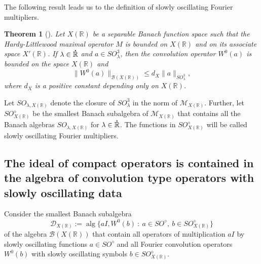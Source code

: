 \documentclass[reqno]{amsproc}
\newcommand{\cB}{\mathcal{B}}
\newcommand{\cM}{\mathcal{M}}
\newcommand{\dR}{{\bf\dot{\R}}}
\newcommand{\R}{\mathbb{R}}
\newtheorem{theorem}{Theorem}[section]
\theoremstyle{definition}
\theoremstyle{remark}
\numberwithin{equation}{section}
\begin{document}
The following result leads us to the definition of slowly oscillating
Fourier multipliers.
\begin{theorem}[{\cite[Theorem~2.5]{K15c}}]
\label{th:boundedness-convolution-SO}
Let $X(\R)$ be a separable Banach function space such that the
Hardy-Littlewood maximal operator $M$ is bounded on $X(\R)$ and on its
associate space $X'(\R)$. If $\lambda\in\dR$ and $a\in SO_\lambda^3$, then
the convolution operator $W^0(a)$ is bounded on the space $X(\R)$ and
\[
\|W^0(a)\|_{\cB(X(\R))}
\le
d_{X}\|a\|_{SO_\lambda^3},
\]
where $d_{X}$ is a positive constant depending only on $X(\R)$.
\end{theorem}
Let $SO_{\lambda,X(\R)}$ denote the closure of $SO_\lambda^3$ in the norm of
$\cM_{X(\R)}$. Further, let $SO_{X(\R)}^\diamond$ be the smallest Banach
subalgebra of $\cM_{X(\R)}$ that contains all the Banach algebras
$SO_{\lambda,X(\R)}$ for $\lambda\in\dR$. The functions in
$SO_{X(\R)}^\diamond$ will be called slowly oscillating Fourier multipliers.
\subsection{The ideal of compact operators is contained in the 
algebra of convolution type operators with slowly oscillating data}
Consider the smallest Banach subalgebra
\[
\mathcal{D}_{X(\R)}
:=
\operatorname{alg}\{aI,W^0(b)\ :\ a\in SO^\diamond,\ b\in SO^\diamond_{X(\R)}\}
\]
of the algebra $\cB(X(\R))$ that contain all operators of multiplication $aI$ 
by slowly oscillating functions $a\in SO^\diamond$ and all Fourier convolution
operators $W^0(b)$ with slowly oscillating symbols $b\in SO_{X(\R)}^\diamond$.
\end{document}
